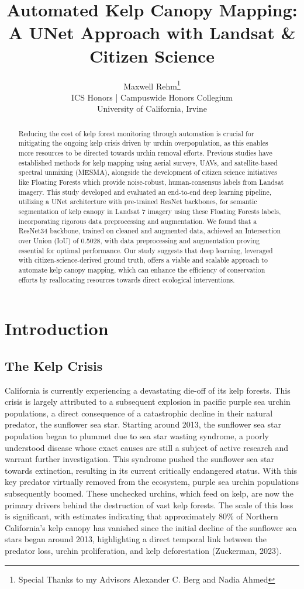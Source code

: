 \documentclass{article}
\title{Automated Kelp Canopy Mapping: A UNet Approach with Landsat \& Citizen Science}
\author{%
  Maxwell Rehm\thanks{Special Thanks to my Advisors Alexander C. Berg and Nadia Ahmed} \\
  ICS Honors | Campuswide Honors Collegium \\
  University of California, Irvine\\
}
\begin{document}
\maketitle

\begin{abstract}
  Reducing the cost of kelp forest monitoring through automation is crucial for mitigating the ongoing kelp crisis driven by urchin overpopulation, as this enables more resources to be directed towards urchin removal efforts. Previous studies have established methods for kelp mapping using aerial surveys, UAVs, and satellite-based spectral unmixing (MESMA), alongside the development of citizen science initiatives like Floating Forests which provide noise-robust, human-consensus labels from Landsat imagery. This study developed and evaluated an end-to-end deep learning pipeline, utilizing a UNet architecture with pre-trained ResNet backbones, for semantic segmentation of kelp canopy in Landsat 7 imagery using these Floating Forests labels, incorporating rigorous data preprocessing and augmentation. We found that a ResNet34 backbone, trained on cleaned and augmented data, achieved an Intersection over Union (IoU) of 0.5028, with data preprocessing and augmentation proving essential for optimal performance. Our study suggests that deep learning, leveraged with citizen-science-derived ground truth, offers a viable and scalable approach to automate kelp canopy mapping, which can enhance the efficiency of conservation efforts by reallocating resources towards direct ecological interventions.
\end{abstract}

\section{Introduction}

\subsection{The Kelp Crisis}

California is currently experiencing a devastating die-off of its kelp forests. This crisis is largely attributed to a subsequent explosion in pacific purple sea urchin populations, a direct consequence of a catastrophic decline in their natural predator, the sunflower sea star. Starting around 2013, the sunflower sea star population began to plummet due to sea star wasting syndrome, a poorly understood disease whose exact causes are still a subject of active research and warrant further investigation. This syndrome pushed the sunflower sea star towards extinction, resulting in its current critically endangered status. With this key predator virtually removed from the ecosystem, purple sea urchin populations subsequently boomed. These unchecked urchins, which feed on kelp, are now the primary drivers behind the destruction of vast kelp forests. The scale of this loss is significant, with estimates indicating that approximately 80\% of Northern California's kelp canopy has vanished since the initial decline of the sunflower sea stars began around 2013, highlighting a direct temporal link between the predator loss, urchin proliferation, and kelp deforestation (Zuckerman, 2023).
\end{document}

